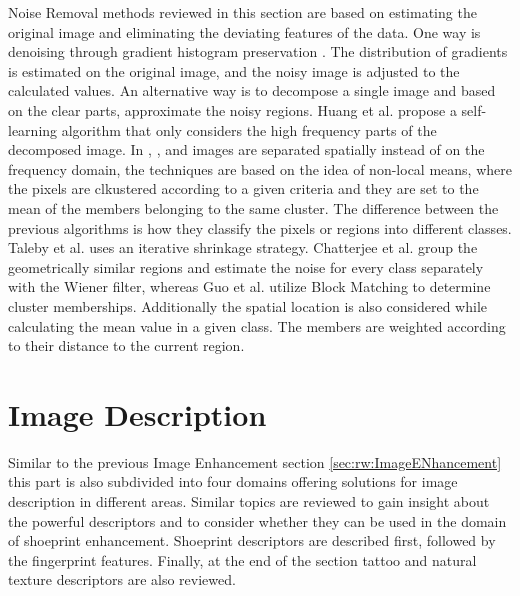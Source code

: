 \documentclass[draft,final]{vutinfth} %
\begin{document}
Noise Removal methods reviewed in this section are based on estimating the original image and eliminating the deviating features of the data.
One way is denoising through gradient histogram preservation \cite{zuo2013texture}.
The distribution of gradients is estimated on the original image, and the noisy image is adjusted to the calculated values.
An alternative way is to decompose a single image and based on the clear parts, approximate the noisy regions.
Huang et al. \cite{huang2013self} propose a self-learning algorithm that only considers the high frequency parts of the decomposed image.
In \cite{xu2015patch}, \cite{talebi2013global}, \cite{chatterjee2011patch} and \cite{guo2015efficient} images  are separated spatially instead of on the frequency domain, the techniques are based on the idea of non-local means, where the pixels are clkustered according to a given criteria and they are set to the mean of the members belonging to the same cluster.
The difference between the previous algorithms is how they classify the pixels or regions into different classes.
Taleby et al. \cite{talebi2013global} uses an iterative shrinkage strategy. 
Chatterjee et al.  \cite{chatterjee2011patch} group the geometrically similar regions and estimate the noise for every class separately with the Wiener filter, whereas Guo et al. \cite{guo2015efficient} utilize Block Matching to determine cluster memberships. 
Additionally the spatial location is also considered while calculating the mean value in a given class.
The members are weighted according to their distance to the current region.

\section{Image Description}

Similar to the previous Image Enhancement section \ref{sec:rw:ImageENhancement} this part is also subdivided into four domains offering solutions for image description in different areas.
Similar topics are reviewed to gain insight about the powerful descriptors and to consider whether they can be used in the domain of shoeprint enhancement.
Shoeprint descriptors are described first, followed by the fingerprint features.
Finally, at the end of the section tattoo and natural texture descriptors are also reviewed. 
\end{document}
